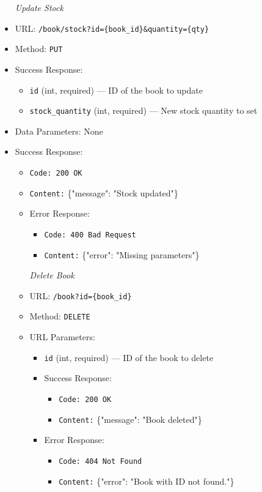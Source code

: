 \begin{itemize}
\item[\textit{Update Stock}] 
\item URL: \texttt{/book/stock?id=\{book\_id\}&quantity=\{qty\}}  
\item Method: \texttt{PUT}  
\item Success Response:
\begin{itemize}
  \item \texttt{id} (int, required) — ID of the book to update
  \item \texttt{stock\_quantity} (int, required) — New stock quantity to set
\end{itemize}
\item Data Parameters: None  
\item Success Response:
\begin{itemize}
  \item \texttt{Code: 200 OK}  
  \item \texttt{Content:} \{"message": "Stock updated"\}
\item Error Response:
\begin{itemize}
  \item \texttt{Code: 400 Bad Request}  
  \item \texttt{Content:} \{"error": "Missing parameters"\}
\end{itemize}

\item[\textit{Delete Book}]
\item URL: \texttt{/book?id=\{book\_id\}}  
\item Method: \texttt{DELETE}  
\item URL Parameters:
\begin{itemize}
  \item \texttt{id} (int, required) — ID of the book to delete
\item Success Response:
\begin{itemize}
  \item \texttt{Code: 200 OK}  
  \item \texttt{Content:} \{"message": "Book deleted"\}
\end{itemize}
\item Error Response:
\begin{itemize}
  \item \texttt{Code: 404 Not Found}  
  \item \texttt{Content:} \{"error": "Book with ID not found."\}
\end{itemize}


\end{itemize}
\end{itemize}
\end{itemize}
